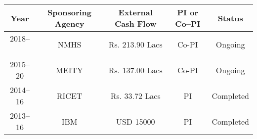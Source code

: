 	\begin{center}{\small
		\begin{tabular}{||c|c|c|c|c||}
			\hline \hline
			Year & Sponsoring Agency & External Cash Flow & PI or Co--PI & Status\\
			\hline \hline
			2018--~~ & NMHS & Rs. 213.90 Lacs & Co-PI & Ongoing\\  \hline
			2015--20 & MEITY & Rs. 137.00 Lacs & Co-PI & Ongoing \\ \hline
			2014--16 & RICET & Rs. 33.72 Lacs & PI & Completed \\ \hline
			2013--16 & IBM & USD 15000 & PI & Completed \\
			\hline \hline 
	\end{tabular}}
\end{center}